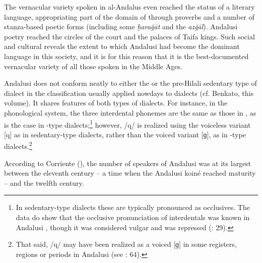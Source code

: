 \documentclass[output=paper,modfonts,nonflat]{langsci/langscibook}
\begin{document}
The vernacular  variety spoken in al-Andalus even reached the status of a literary language, appropriating part of the domain of   through proverbs and a number of stanza-based poetic forms (including some \textit{ḫaraǧāt} and the \textit{azǧāl}). Andalusi  poetry reached the circles of the court and the palaces of Taifa kings. Such social and cultural  reveals the extent to which Andalusi  had become the dominant language in this society, and it is for this reason that it is the best-documented vernacular  variety of all those spoken in the Middle Ages. 

Andalusi  does not conform neatly to either the  or the pre-Hilali sedentary type of dialect in the classification usually applied nowdays to   dialects (cf. Benkato, this volume). It shares features of both types of dialects. For instance, in the phonological system, the three interdental phonemes are the same as those in  , as is the case in -type  dialects;\footnote{In sedentary-type  dialects these are typically pronounced as occlusives. The data do show that the occlusive pronunciation of interdentals was known in Andalusi , though it was considered vulgar and was repressed (\citealt{CorrientePereiraVicente2015}: 29).}  however, /q/ is realized using the voiceless variant [q] as in sedentary-type dialects, rather than the voiced variant [ɡ], as in -type dialects.\footnote{That said, /q/ may have been realized as a voiced [ɡ] in some registers, regions or periods in Andalusi  (see \citealt{CorrientePereiraVicente2015}: 64).}

According to Corriente (\citeyear[34]{Corriente1992book}), the number of speakers of Andalusi  was at its largest between the eleventh century – a time when the Andalusi koiné reached maturity – and the twelfth century. 
\end{document}
